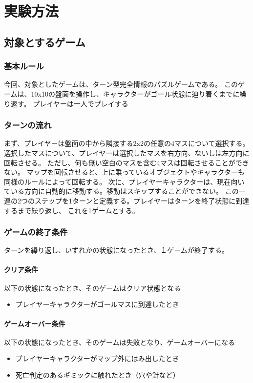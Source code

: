 \chapter{実験方法}
\section{対象とするゲーム}
\subsection{基本ルール}
今回、対象としたゲームは、ターン型完全情報のパズルゲームである。
このゲームは、10x10の盤面を操作し、キャラクターがゴール状態に辿り着くまでに繰り返す。
プレイヤーは一人でプレイする
\subsection{ターンの流れ}
まず、プレイヤーは盤面の中から隣接する2x2の任意の4マスについて選択する。
選択したマスについて、プレイヤーは選択したマスを右方向、ないしは左方向に回転させる。
ただし、何も無い空白のマスを含む4マスは回転させることができない。
マップを回転させると、上に乗っているオブジェクトやキャラクターも同様のルールによって回転する。
次に、プレイヤーキャラクターは、現在向いている方向に自動的に移動する。移動はスキップすることができない。
この一連の2つのステップを1ターンと定義する。プレイヤーはターンを終了状態に到達するまで繰り返し、
これを1ゲームとする。
\subsection{ゲームの終了条件}
ターンを繰り返し、いずれかの状態になったとき、１ゲームが終了する。

\subsubsection{クリア条件}
以下の状態になったとき、そのゲームはクリア状態となる
\begin{itemize}
  \item プレイヤーキャラクターがゴールマスに到達したとき
\end{itemize}

\subsubsection{ゲームオーバー条件}
以下の状態になったとき、そのゲームは失敗となり、ゲームオーバーになる
\begin{itemize}
    \item プレイヤーキャラクターがマップ外にはみ出したとき
    \item 死亡判定のあるギミックに触れたとき（穴や針など）
\end{itemize}

